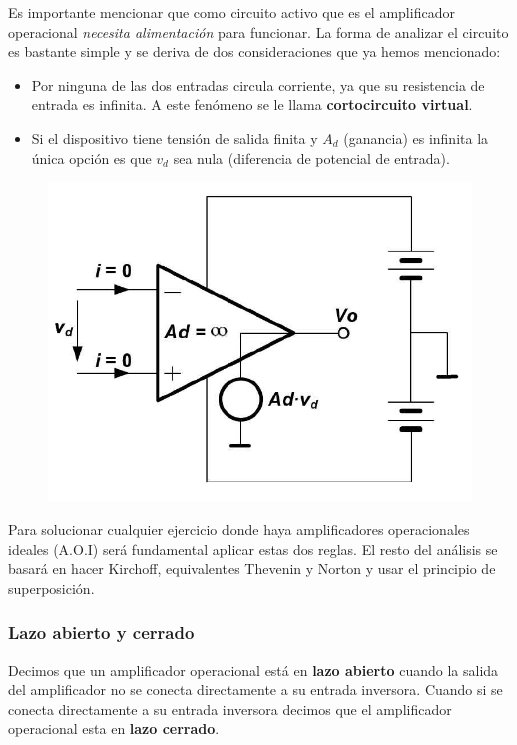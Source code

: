 \documentclass[12pt,a4paper]{article}
\numberwithin{equation}{section}
\numberwithin{figure}{section}
\begin{document}
Es importante mencionar que como circuito activo que es el amplificador operacional \textit{necesita alimentación} para funcionar. La forma de analizar el circuito es bastante simple y se deriva de dos consideraciones que ya hemos mencionado:

\begin{itemize}
\item Por ninguna de las dos entradas circula corriente, ya que su resistencia de entrada es infinita. A este fenómeno se le llama \textbf{cortocircuito virtual}.
\item Si el dispositivo tiene tensión de salida finita y $A_d$ (ganancia) es infinita la única opción es que $v_d$ sea nula (diferencia de potencial de entrada).
\end{itemize}

\begin{figure}[h!] \centering
\includegraphics[scale=0.5]{1.1.Amplificador_ideal.png}
\end{figure}

Para solucionar cualquier ejercicio donde haya amplificadores operacionales ideales (A.O.I) será fundamental aplicar estas dos reglas. El resto del análisis se basará en hacer Kirchoff, equivalentes Thevenin y Norton y usar el principio de superposición.



\subsubsection{Lazo abierto y cerrado}

Decimos 	que un amplificador operacional está en \textbf{lazo abierto} cuando la salida del amplificador no se conecta directamente a su entrada inversora. Cuando si se conecta directamente a su entrada inversora decimos que el amplificador operacional esta en \textbf{lazo cerrado}. \\
\end{document}
